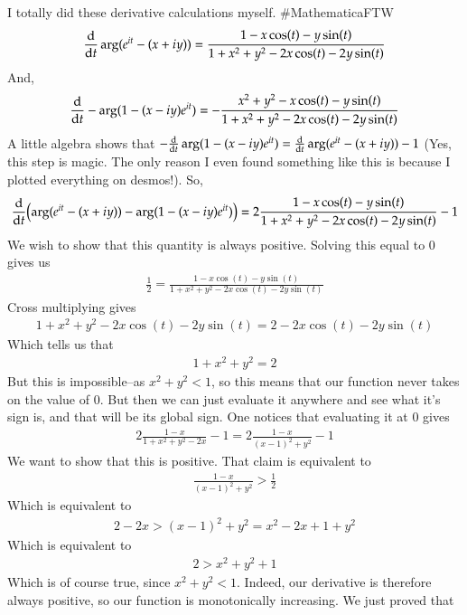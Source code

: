 \documentclass[12pt]{article}
\theoremstyle{definitionstyle}
\begin{document}
\begin{enumerate}[leftmargin=\labelsep]
		I totally did these derivative calculations myself. \#MathematicaFTW
		\begin{align*}
			\dv{t} \arg(e^{it}-(x+iy)) = \frac{1-x\cos(t)-y\sin(t)}{1+x^2+y^2-2x\cos(t)-2y\sin(t)}
		\end{align*}
		And,
		\begin{align*}
			\dv{t} -\arg(1-(x-iy)e^{it}) = -\frac{x^2+y^2-x\cos(t)-y\sin(t)}{1+x^2+y^2-2x\cos(t)-2y\sin(t)}
		\end{align*}
		A little algebra shows that $-\dv{t} \arg(1-(x-iy)e^{it}) = \dv{t} \arg(e^{it}-(x+iy)) - 1$ (Yes, this step is magic. The only reason I even found something like this is because I plotted everything on desmos!). So,
		\begin{align*}
			\dv{t} \qty(\arg(e^{it}-(x+iy)) - \arg(1-(x-iy)e^{it})) =  2\frac{1-x\cos(t)-y\sin(t)}{1+x^2+y^2-2x\cos(t)-2y\sin(t)}-1
		\end{align*}	
		We wish to show that this quantity is always positive. Solving this equal to 0 gives us
		\begin{align*}
			\frac12 = \frac{1-x\cos(t)-y\sin(t)}{1+x^2+y^2-2x\cos(t)-2y\sin(t)}
		\end{align*}
		Cross multiplying gives
		\begin{align*}
			1+x^2+y^2-2x\cos(t)-2y\sin(t) = 2-2x\cos(t)-2y\sin(t)
		\end{align*}
		Which tells us that
		\begin{align*}
			1+x^2+y^2 = 2
		\end{align*}
		But this is impossible--as $x^2+y^2 < 1$, so this means that our function never takes on the value of 0. But then we can just evaluate it anywhere and see what it's sign is, and that will be its global sign. One notices that evaluating it at 0 gives
		\begin{align*}
			2\frac{1-x}{1+x^2+y^2-2x}-1 = 2\frac{1-x}{(x-1)^2+y^2}-1
		\end{align*}
		We want to show that this is positive. That claim is equivalent to
		\begin{align*}
			\frac{1-x}{(x-1)^2+y^2} > \frac12
		\end{align*}
		Which is equivalent to
		\begin{align*}
			2-2x > (x-1)^2 + y^2 = x^2-2x+1+y^2
		\end{align*}
		Which is equivalent to
		\begin{align*}
			2 > x^2+y^2+1
		\end{align*}
		Which is of course true, since $x^2+y^2 < 1$. Indeed, our derivative is therefore always positive, so our function is monotonically increasing. We just proved that

\end{enumerate}
\end{document}
